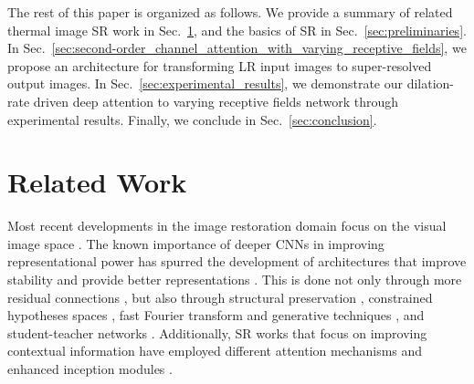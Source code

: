 \documentclass[runningheads]{llncs}
\begin{document}
The rest of this paper is organized as follows. We provide a summary of related
thermal image SR work in Sec.~\ref{sec:related_work}, and the basics of SR in
Sec.~\ref{sec:preliminaries}. In
Sec.~\ref{sec:second-order_channel_attention_with_varying_receptive_fields}, we
propose an architecture for transforming LR input images to super-resolved
output images. In Sec.~\ref{sec:experimental_results}, we demonstrate our
dilation-rate driven deep attention to varying receptive fields network through
experimental results. Finally, we conclude in Sec.~\ref{sec:conclusion}.

\section{Related Work}
\label{sec:related_work}
Most recent developments in the image restoration domain focus on the visual
image space \cite{nasrollahi2014super,wang2020deep,anwar2020deep}. The known
importance of deeper CNNs in improving representational power has spurred the
development of architectures that improve stability and provide better
representations \cite{kim2016accurate,lim2017enhanced}. This is done not only
through more residual connections
\cite{kim2016deeply,anwar2020densely,liu2020residual}, but also through
structural preservation \cite{luo2016understanding,isobe2020video}, constrained
hypotheses spaces \cite{bahat2020explorable}, fast Fourier transform
\cite{reddy1996fft} and generative techniques \cite{saharia2021image}, and
student-teacher networks \cite{lee2020learning}. Additionally, SR works that
focus on improving contextual information have employed different attention
mechanisms \cite{mei2020image} and enhanced inception modules
\cite{muhammad2019multi}. 


\end{document}
